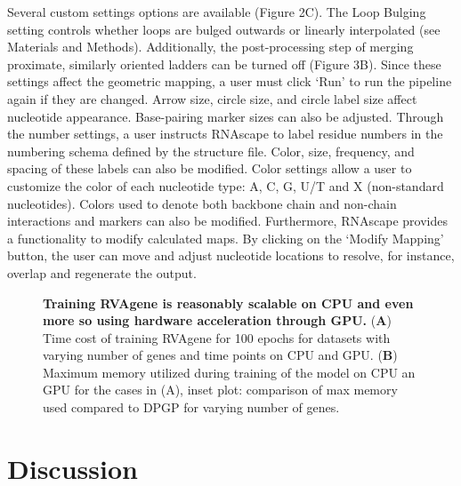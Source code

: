 Several custom settings options are available (Figure 2C). The Loop Bulging setting controls whether loops are bulged outwards or linearly interpolated (see Materials and Methods). Additionally, the post-processing step of merging proximate, similarly oriented ladders can be turned off (Figure 3B). Since these settings affect the geometric mapping, a user must click ‘Run’ to run the pipeline again if they are changed. Arrow size, circle size, and circle label size affect nucleotide appearance. Base-pairing marker sizes can also be adjusted. Through the number settings, a user instructs RNAscape to label residue numbers in the numbering schema defined by the structure file. Color, size, frequency, and spacing of these labels can also be modified. Color settings allow a user to customize the color of each nucleotide type: A, C, G, U/T and X (non-standard nucleotides). Colors used to denote both backbone chain and non-chain interactions and markers can also be modified. Furthermore, RNAscape provides a functionality to modify calculated maps. By clicking on the ‘Modify Mapping’ button, the user can move and adjust nucleotide locations to resolve, for instance, overlap and regenerate the output.
\begin{center}
    \begin{figure}
        \caption[Computational cost of training RVAgene]{\textbf{Training RVAgene is reasonably scalable on CPU and even more so using hardware acceleration through GPU.} ({\bf A}) Time cost of training RVAgene for 100 epochs for datasets with varying number of genes and time points on CPU and GPU. ({\bf B}) Maximum memory utilized during training of the model on CPU an GPU for the cases in (A), inset plot: comparison of max memory used compared to DPGP for varying number of genes.}
  \label{fig:rnascape4}
\end{figure}
\end{center}

\section{Discussion}

